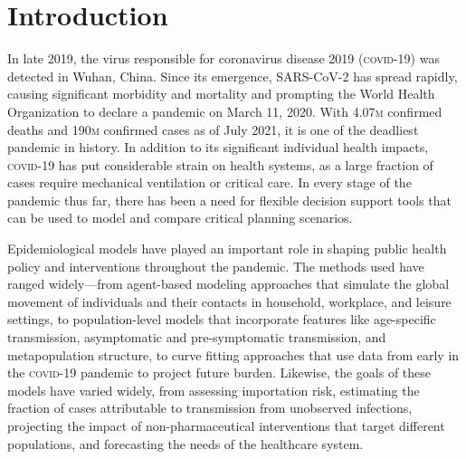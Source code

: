 

\section{Introduction}

In late 2019, the virus responsible for coronavirus disease 2019 (\textsc{covid}-19) was detected in Wuhan, China\cite{Zhu:NovelCoronavirusPatients:2020}. Since its emergence, SARS-CoV-2 has spread rapidly, causing significant morbidity and mortality and prompting the World Health Organization to declare a pandemic on March 11, 2020\cite{WHO:WHODirectorGeneralOpening:2020}. With 4.07\textsc{m} confirmed deaths and 190\textsc{m} confirmed cases as of July 2021, it is one of the deadliest pandemic in history. In addition to its significant individual health impacts, \textsc{covid}-19 has put considerable strain on health systems, as a large fraction of cases require mechanical ventilation or critical care\cite{Huang:ClinicalFeaturesPatients:2020}. In every stage of the pandemic thus far, there has been a need for flexible decision support tools that can be used to model and compare critical planning scenarios. 

Epidemiological models have played an important role in shaping public health policy and interventions throughout the pandemic. The methods used have ranged widely—from agent-based modeling approaches that simulate the global movement of individuals and their contacts in household, workplace, and leisure settings\cite{Ferguson:ReportImpactNonpharmaceutical:2020}, to population-level models that incorporate features like age-specific transmission, asymptomatic and pre-symptomatic transmission, and metapopulation structure\cite{Chinazzi:EffectTravelRestrictions:2020,Branas:FlatteningCurveIt:2020,Moghadas:ProjectingHospitalUtilization:2020,Davies:AgedependentEffectsTransmission:2020}, to curve fitting approaches that use data from early in the \textsc{covid}-19 pandemic to project future burden\cite{IHME:ForecastingImpactFirst:2020}. Likewise, the goals of these models have varied widely, from assessing importation risk, estimating the fraction of cases attributable to transmission from unobserved infections, projecting the impact of non-pharmaceutical interventions that target different populations, and forecasting the needs of the healthcare system. 

